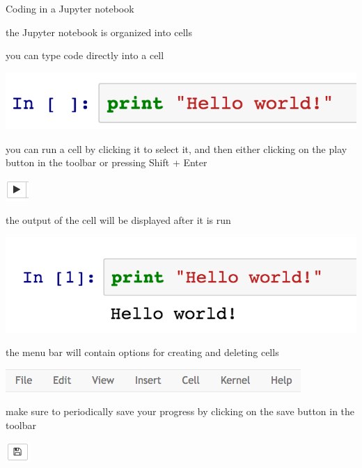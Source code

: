 \documentclass[10pt,mathserif]{beamer}
\begin{document}
\begin{frame}[fragile]{Coding in a Jupyter notebook}
\BIT
\item the Jupyter notebook is organized into cells
\item you can type code directly into a cell
  \begin{center}
    \includegraphics[height=0.06\textheight]{images/jupyter_cell_input.png}
  \end{center}
\item you can run a cell by clicking it to select it, and then either clicking on the play button in the toolbar
  or pressing Shift + Enter
  \begin{center}
    \includegraphics[height=0.05\textheight]{images/juliabox_play_button.png}
  \end{center}
\item the output of the cell will be displayed after it is run
  \begin{center}
    \includegraphics[height=0.1\textheight]{images/jupyter_cell_output.png}
  \end{center}
\item the menu bar will contain options for creating and deleting cells
  \begin{center}
    \includegraphics[height=0.05\textheight]{images/juliabox_menu.png}
  \end{center}
\item make sure to periodically save your progress by clicking on the save button in the toolbar
  \begin{center}
    \includegraphics[height=0.05\textheight]{images/juliabox_save_button.png}
  \end{center}
\EIT
\end{frame}
\end{document}
